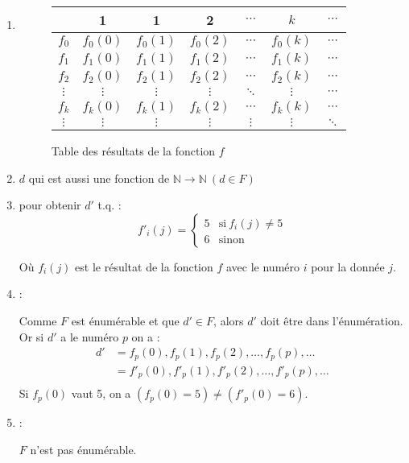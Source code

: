 \begin{enumerate}
\item {}
	\begin{figure}[H]
    		\centering
    		\begin{tabular}{c|cccccc}
		 & 1 & 1 & 2 & $\cdots$ & $k$ & $\cdots$ \\ 
		\hline 
		$f_0$ & $f_0(0)$ & $f_0(1)$ & $f_0(2)$ & $\cdots$ & $f_0(k)$ & $\cdots$ \\ 
		$f_1$ & $f_1(0)$ & $f_1(1)$ & $f_1(2)$ & $\cdots$ & $f_1(k)$ & $\cdots$ \\ 
		$f_2$ & $f_2(0)$ & $f_2(1)$ & $f_2(2)$ & $\cdots$ & $f_2(k)$ & $\cdots$ \\ 
		$\vdots$ & $\vdots$ & $\vdots$ & $\vdots$ & $\ddots$ & $\vdots$ & $\cdots$ \\ 
		$f_k$ & $f_k(0)$ & $f_k(1)$ & $f_k(2)$ & $\cdots$ & $f_k(k)$ & $\cdots$ \\ 
		$\vdots$ & $\vdots$ & $\vdots$ & $\vdots$ & $\vdots$ & $\vdots$ & $\ddots$ \\ 
		\end{tabular}
		\caption{Table des résultats de la fonction $f$}
	\end{figure}
\item {} $d$ qui est aussi une fonction de $\mathbb{N} \rightarrow \mathbb{N} \ (d \in F)$
\item {} pour obtenir $d'$ t.q. :
	\begin{equation*}
		f'_i(j)=
		\begin{cases}
      		5 & \text{si}\ f_i(j) \neq 5\\
      		6 & \text{sinon}\
      	\end{cases}
    \end{equation*}
    
    Où $f_i(j)$ est le résultat de la fonction $f$ avec le numéro $i$ pour la donnée $j$.
\item \red{Contradiction} :

	Comme $F$ est énumérable et que $d' \in F$, alors $d'$ doit être dans l'énumération. Or si $d'$ a le numéro $p$ on a :
	\begin{align*}
		d' &= f_p(0),f_p(1),f_p(2),\ldots,f_p(p),\ldots\\
		   &= f'_p(0),f'_p(1),f'_p(2),\ldots,f'_p(p),\ldots\\
    \end{align*}
    Si $f_p(0)$ vaut 5, on a $(f_p(0) = 5) \neq (f'_p(0) = 6)$.
\item {} :

	$F$ n'est pas énumérable.
\end{enumerate}

